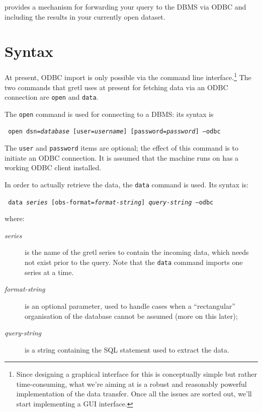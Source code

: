  provides a mechanism for forwarding your query to the DBMS
via ODBC and including the results in your currently open dataset.

\section{Syntax}
\label{sec:odbc-syntax}

At present, ODBC import is only possible via the command line
interface.\footnote{Since designing a graphical interface for this is
  conceptually simple but rather time-consuming, what we're aiming at
  is a robust and reasonably powerful implementation of the data
  transfer. Once all the issues are sorted out, we'll start
  implementing a GUI interface.} The two commands that gretl uses at
present for fetching data via an ODBC connection are \texttt{open} and
\texttt{data}.

The \texttt{open} command is used for connecting to a DBMS: its syntax
is
\begin{flushleft}
\texttt{%
  open dsn=\emph{database} [user=\emph{username}]
  [password=\emph{password}] --odbc
}
\end{flushleft}
The \texttt{user} and \texttt{password} items are optional; the effect
of this command is to initiate an ODBC connection. It is assumed that
the machine  runs on has a working ODBC client installed.

In order to actually retrieve the data, the \texttt{data} command is
used. Its syntax is:
\begin{flushleft}
\texttt{%
  data \emph{series} [obs-format=\emph{format-string}] \emph{query-string} --odbc
}
\end{flushleft}
where:
\begin{description}
\item[\emph{series}] is the name of the gretl series to contain the
  incoming data, which needs not exist prior to the query. Note that
  the \texttt{data} command imports one series at a time.
\item[\emph{format-string}] is an optional parameter, used to handle
  cases when a ``rectangular'' organisation of the database cannot be
  assumed (more on this later);
\item[\emph{query-string}] is a string containing the SQL statement
  used to extract the data.
\end{description}

